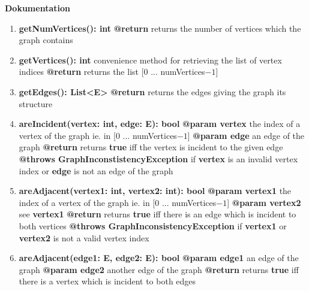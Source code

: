 \documentclass{article}
\begin{document}
	\textbf{Dokumentation}
	\begin{enumerate}[+]
		\item{
			\textbf{getNumVertices(): int} \newline
			\textbf{@return} returns the number of vertices which the graph contains
		}
		\item{
			\textbf{getVertices(): int} \newline
			convenience method for retrieving the list of vertex indices \newline
			\textbf{@return} returns the list [0 ... numVertices$-1$]
		}
		\item{
			\textbf{getEdges(): List<E>} \newline
			\textbf{@return} returns the edges giving the graph its structure
		}
		\item{
			\textbf{areIncident(vertex: int, edge: E): bool} \newline
			\textbf{@param vertex} the index of a vertex of the graph ie. in [0 ... numVertices$-1$]\newline
			\textbf{@param edge} an edge of the graph \newline 
			\textbf{@return} returns \textbf{true} iff the vertex is incident to the given edge \newline
			\textbf{@throws GraphInconstistencyException} if \textbf{vertex} is an invalid vertex index or \textbf{edge} is not an edge of the graph
		}
		\item{
			\textbf{areAdjacent(vertex1: int, vertex2: int): bool} \newline
			\textbf{@param vertex1} the index of a vertex of the graph ie. in [0 ... numVertices$-1$] \newline
			\textbf{@param vertex2} see \textbf{vertex1} \newline
			\textbf{@return} returns \textbf{true} iff there is an edge which is incident to both vertices \newline
			\textbf{@throws GraphInconsistencyException} if \textbf{vertex1} or \textbf{vertex2} is not a valid vertex index
		}
		\item{
			\textbf{areAdjacent(edge1: E, edge2: E): bool} \newline
			\textbf{@param edge1} an edge of the graph \newline
			\textbf{@param edge2} another edge of the graph \newline
			\textbf{@return} returns \textbf{true} iff there is a vertex which is incident to both edges \newline
}
\end{enumerate}
\end{document}
